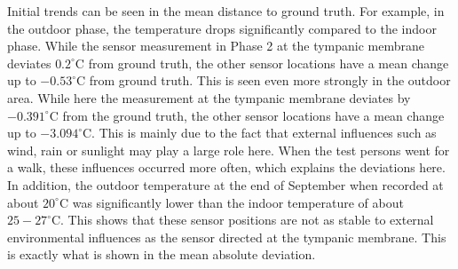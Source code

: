 Initial trends can be seen in the mean distance to ground truth.
For example, in the outdoor phase, the temperature drops significantly compared to the indoor phase.
While the sensor measurement in Phase 2 at the tympanic membrane deviates $0.2 ^\circ\text{C}$ from ground truth, the other sensor locations have a mean change up to $-0.53^\circ\text{C}$ from ground truth.
This is seen even more strongly in the outdoor area. 
While here the measurement at the tympanic membrane deviates by $-0.391 ^\circ\text{C}$ from the ground truth, the other sensor locations have a mean change up to $-3.094^\circ\text{C}$.
This is mainly due to the fact that external influences such as wind, rain or sunlight may play a large role here.
When the test persons went for a walk, these influences occurred more often, which explains the deviations here. 
In addition, the outdoor temperature at the end of September when recorded at about $20^\circ\text{C}$ was significantly lower than the indoor temperature of about $25-27^\circ\text{C}$.
This shows that these sensor positions are not as stable to external environmental influences as the sensor directed at the tympanic membrane.
This is exactly what is shown in the mean absolute deviation. 

